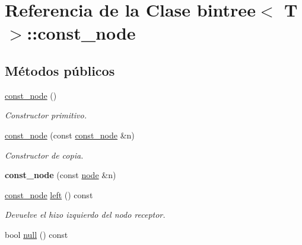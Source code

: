 \hypertarget{classbintree_1_1const__node}{}\section{Referencia de la Clase bintree$<$ T $>$\+:\+:const\+\_\+node}
\label{classbintree_1_1const__node}
\subsection*{Métodos públicos}
\begin{DoxyCompactItemize}
\item 
\hypertarget{classbintree_1_1const__node_a9200b01b90aa318f3a748d5fe7b2b612}{}\hyperlink{classbintree_1_1const__node_a9200b01b90aa318f3a748d5fe7b2b612}{const\+\_\+node} ()\label{classbintree_1_1const__node_a9200b01b90aa318f3a748d5fe7b2b612}

\begin{DoxyCompactList}\small\item\em Constructor primitivo. \end{DoxyCompactList}\item 
\hyperlink{classbintree_1_1const__node_a1725dc0a63ca1ec0b4462cc52c673057}{const\+\_\+node} (const \hyperlink{classbintree_1_1const__node}{const\+\_\+node} \&n)
\begin{DoxyCompactList}\small\item\em Constructor de copia. \end{DoxyCompactList}\item 
\hypertarget{classbintree_1_1const__node_ae72448736a3ddbaca192f1b8cf636545}{}{\bfseries const\+\_\+node} (const \hyperlink{classbintree_1_1node}{node} \&n)\label{classbintree_1_1const__node_ae72448736a3ddbaca192f1b8cf636545}

\item 
\hyperlink{classbintree_1_1const__node}{const\+\_\+node} \hyperlink{classbintree_1_1const__node_ac7d405aa47245cd42854eb1b9afcd1f5}{left} () const 
\begin{DoxyCompactList}\small\item\em Devuelve el hizo izquierdo del nodo receptor. \end{DoxyCompactList}\item 
\hypertarget{classbintree_1_1const__node_a48fe173369ba88eda39e56f262cde767}{}bool \hyperlink{classbintree_1_1const__node_a48fe173369ba88eda39e56f262cde767}{null} () const \label{classbintree_1_1const__node_a48fe173369ba88eda39e56f262cde767}


\end{DoxyCompactItemize}
